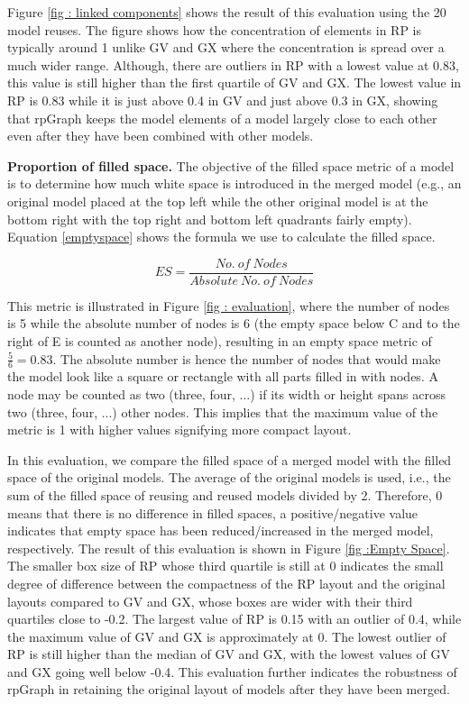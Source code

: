 Figure \ref{fig : linked components} shows the result of this evaluation using the 20 model reuses. The figure shows how the concentration of elements in RP is typically around 1 unlike GV and GX where the concentration is spread over a much wider range. Although, there are outliers in RP with a lowest value at 0.83, this value is still higher than the first quartile of GV and GX. The lowest value in RP is 0.83 while it is just above 0.4 in GV and just above 0.3 in GX, showing that rpGraph keeps the model elements of a model largely close to each other even after they have been combined with other models.

\textbf{Proportion of filled space.} The objective of the filled space metric of a model is to determine how much white space is introduced in the merged model (e.g., an original model placed at the top left while the other original model is at the bottom right with the top right and bottom left quadrants fairly empty). Equation \ref{emptyspace} shows the formula we use to calculate the filled space.

\begin{equation} \label{emptyspace}
  ES = \frac{No.\ of\ Nodes}{Absolute\ No.\ of\ Nodes}
\end{equation}

This metric is illustrated in Figure \ref{fig : evaluation}, where the number of nodes is 5 while the absolute number of nodes is 6 (the empty space below C and to the right of E is counted as another node), resulting in an empty space metric of $\frac{5}{6} = 0.83$. The absolute number is hence the number of nodes that would make the model look like a square or rectangle with all parts filled in with nodes. A node may be counted as two (three, four, ...) if its width or height spans across two (three, four, ...) other nodes. This implies that the maximum value of the metric is 1 with higher values signifying more compact layout. 

In this evaluation, we compare the filled space of a merged model with the filled space of the original models. The average of the original models is used, i.e., the sum of the filled space of reusing and reused models divided by 2. Therefore, 0 means that there is no difference in filled spaces, a positive/negative value indicates that empty space has been reduced/increased in the merged model, respectively. The result of this evaluation is shown in Figure \ref{fig :Empty Space}. The smaller box size of RP whose third quartile is still at 0 indicates the small degree of difference between the compactness of the RP layout and the original layouts compared to GV and GX, whose boxes are wider with their third quartiles close to -0.2. The largest value of RP is 0.15 with an outlier of 0.4, while the maximum value of GV and GX is approximately at 0. The lowest outlier of RP is still higher than the median of GV and GX, with the lowest values of GV and GX going well below -0.4. This evaluation further indicates the robustness of rpGraph in retaining the original layout of models after they have been merged.

